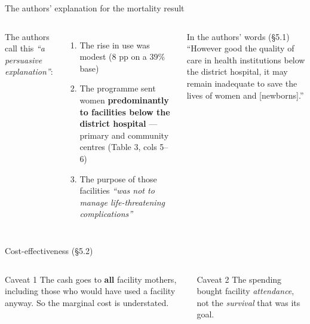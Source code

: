 \documentclass[aspectratio=169,11pt]{beamer}
\begin{document}
\begin{frame}{The authors' explanation for the mortality result}
  \begin{columns}[T]
    The authors call this \emph{``a persuasive explanation''}:
    \begin{enumerate}
      \item The rise in use was modest (8 pp on a 39\% base)
      \item The programme sent women \textbf{predominantly to facilities below the district hospital} --- primary and community centres (Table 3, cols 5--6)
      \item The purpose of those facilities \emph{``was not to manage life-threatening complications''}
    \end{enumerate}
    \begin{block}{In the authors' words (\S5.1)}
      {\footnotesize ``However good the quality of care in health institutions below the district hospital, it may remain inadequate to save the lives of women and [newborns].''}
    \end{block}
  \end{columns}
\end{frame}

\begin{frame}{Cost-effectiveness (\S5.2)}
  \begin{center}
  \end{center}
  \vspace{0.4em}
  \begin{columns}[T]
    \begin{alertblock}{\footnotesize Caveat 1}
      {\footnotesize The cash goes to \textbf{all} facility mothers, including those who would have used a facility anyway. So the marginal cost is understated.}
    \end{alertblock}
    \begin{alertblock}{\footnotesize Caveat 2}
      {\footnotesize The spending bought facility \emph{attendance}, not the \emph{survival} that was its goal.}
    \end{alertblock}
  \end{columns}
\end{frame}
\end{document}
